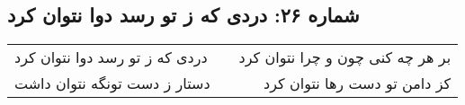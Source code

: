\begin{center}
\section*{شماره ۲۶: دردی که ز تو رسد دوا نتوان کرد}
\label{sec:026}
\begin{longtable}{l p{0.5cm} r}
دردی که ز تو رسد دوا نتوان کرد
&&
بر هر چه کنی چون و چرا نتوان کرد
\\
دستار ز دست تونگه نتوان داشت
&&
کز دامن تو دست رها نتوان کرد
\\
\end{longtable}
\end{center}
